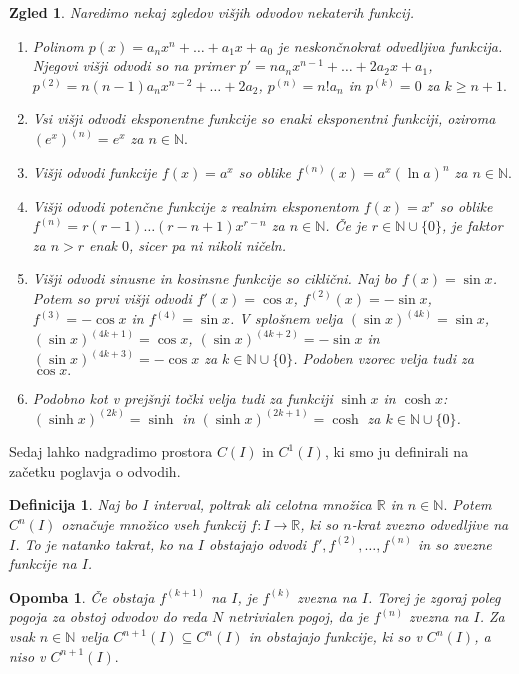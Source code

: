 \documentclass[10pt, a4paper]{article}
\newtheorem{defi}{Definicija}[section]
\newenvironment{noticeB}{%
  \tcolorbox[%
  notitle,
  empty,
  enhanced,  %
  breakable,
  coltext=black,
  colback=white, 
  fontupper=\rmfamily,
  parbox=false,
  noparskip,
  sharp corners,
  boxrule=-1pt,  %
  frame hidden,
  left=7pt,  %
  right=7pt,
  top=5pt,
  bottom=5pt,
  before skip=2.5ex plus 2pt,
  after skip=2.5ex plus 2pt,
  borderline west = {1.5pt}{-0.1pt}{blue!30!black}, %
  overlay unbroken and last={%
    \draw[color=black, line width=1.25pt]
    ($(frame.south west)+(1.pt, -0.1pt)$) -- ++(2em, 0);
  }
  ]}
{\endtcolorbox}
\newenvironment{definicija}{\begin{defi}\begin{noticeB}}{%
    \end{noticeB}\end{defi}}
\newtheorem*{opomba}{Opomba}
\newtheorem{zgled}{Zgled}[section]
\newcommand{\N}{\mathbb {N}}
\newcommand{\R}{\mathbb {R}}
\begin{document}
\begin{zgled}
    Naredimo nekaj zgledov višjih odvodov nekaterih funkcij.
    \begin{enumerate}
        \item Polinom $p(x) = a_n x^n + \dots + a_1 x + a_0$ je neskončnokrat odvedljiva funkcija.
        Njegovi višji odvodi so na primer $p' = n a_n x^{n-1} +\dots + 2 a_2 x + a_1$, $p^{(2)} = n(n-1) a_n x^{n-2} + \dots + 2 a_2$, $p^{(n)} = n! a_n$ in $p^{(k)} = 0$ za $k \geq n+1.$
        \item Vsi višji odvodi eksponentne funkcije so enaki eksponentni funkciji, oziroma $(e^x)^{(n)} = e^x$ za $n \in \N.$
        \item Višji odvodi funkcije $f(x) = a^x$ so oblike $f^{(n)} (x) = a^x (\ln a)^n$ za $n \in \N.$
        \item Višji odvodi potenčne funkcije z realnim eksponentom $f(x) = x^r$ so oblike $f^{(n)} = r (r-1) \dots (r-n + 1) x^{r-n}$ za $n \in \N$. 
        Če je $r \in \N \cup \{0\}$, je faktor za $n > r$ enak $0$, sicer pa ni nikoli ničeln.
        \item Višji odvodi sinusne in kosinsne funkcije so ciklični. 
        Naj bo $f(x) = \sin x$. 
        Potem so prvi višji odvodi $f'(x) = \cos x$, $f^{(2)} (x) = - \sin x$, $f^{(3)} = - \cos x$ in $f^{(4)} = \sin x$.
        V splošnem velja $(\sin x)^{(4k)} = \sin x$, $(\sin x)^{(4k + 1)} = \cos x$, $(\sin x)^{(4k + 2)} = - \sin x$ in $(\sin x)^{(4k + 3)} = - \cos x$ za $k \in \N \cup \{0\}$.
        Podoben vzorec velja tudi za $\cos x.$
        \item Podobno kot v prejšnji točki velja tudi za funkciji $\sinh x$ in $\cosh x$: $(\sinh x)^{(2k)} = \sinh$ in $(\sinh x)^{(2k + 1)} = \cosh$ za $k \in \N \cup \{0\}$.
    \end{enumerate}
\end{zgled}

Sedaj lahko nadgradimo prostora $C(I)$ in $C^1(I)$, ki smo ju definirali na začetku poglavja o odvodih.

\begin{definicija}
    Naj bo $I$ interval, poltrak ali celotna množica $\R$ in $n \in \N.$ 
    Potem $C^{n} (I)$ označuje množico vseh funkcij $f : I \rightarrow \R$, ki so $n$-krat zvezno odvedljive na $I$.
    To je natanko takrat, ko na $I$ obstajajo odvodi $f', f^{(2)}, \ldots, f^{(n)}$ in so zvezne funkcije na $I$.
\end{definicija}

\begin{opomba}
    Če obstaja $f^{(k+1)}$ na $I$, je $f^(k)$ zvezna na $I$. 
    Torej je zgoraj poleg pogoja za obstoj odvodov do reda $N$ netrivialen pogoj, da je $f^{(n)}$ zvezna na $I$.
    Za vsak $n \in \N$ velja $C^{n+1}(I) \subseteq C^{n} (I)$ in obstajajo funkcije, ki so v $C^n (I)$, a niso v $C^{n+1}(I).$ 
\end{opomba}
\end{document}
